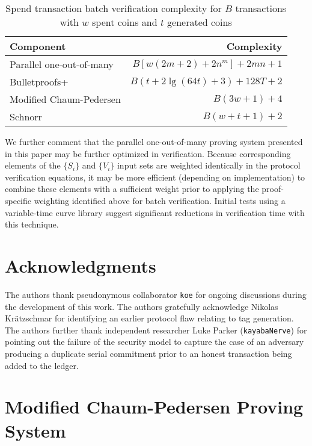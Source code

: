 \documentclass{llncs}
\begin{document}
\begin{table}
    \caption{Spend transaction batch verification complexity for $B$ transactions with $w$ spent coins and $t$ generated coins}
    \label{table:time}
    \centering
    \begin{tabular}{|l|r|}
        \hline
        \textbf{Component} & \textbf{Complexity} \\
        \hline
        Parallel one-out-of-many & $B[w(2m + 2) + 2n^m] + 2mn + 1$ \\
        Bulletproofs+ & $B(t + 2\lg(64t) + 3) + 128T + 2$ \\
        Modified Chaum-Pedersen & $B(3w + 1) + 4$ \\
        Schnorr & $B(w + t + 1) + 2$ \\
        \hline
    \end{tabular}
\end{table}

We further comment that the parallel one-out-of-many proving system presented in this paper may be further optimized in verification.
Because corresponding elements of the $\{S_i\}$ and $\{V_i\}$ input sets are weighted identically in the protocol verification equations, it may be more efficient (depending on implementation) to combine these elements with a sufficient weight prior to applying the proof-specific weighting identified above for batch verification.
Initial tests using a variable-time curve library suggest significant reductions in verification time with this technique.


\section*{Acknowledgments}

The authors thank pseudonymous collaborator \texttt{koe} for ongoing discussions during the development of this work.
The authors gratefully acknowledge Nikolas Kr\"{a}tzschmar for identifying an earlier protocol flaw relating to tag generation.
The authors further thank independent researcher Luke Parker (\texttt{kayabaNerve}) for pointing out the failure of the security model to capture the case of an adversary producing a duplicate serial commitment prior to an honest transaction being added to the ledger.





\appendix


\section{Modified Chaum-Pedersen Proving System}
\label{app:chaum}
\end{document}
